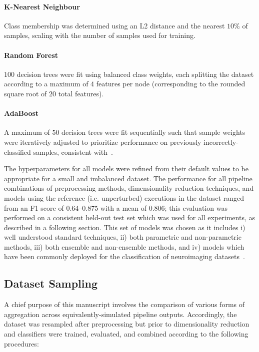 \documentclass[10pt]{SelfArx} %
\begin{document}
\paragraph{K-Nearest Neighbour} Class membership was determined using an L2 distance and the nearest $10\%$ of
samples, scaling with the number of samples used for training.

\paragraph{Random Forest} $100$ decision trees were fit using balanced class weights, each splitting the dataset
according to a maximum of $4$ features per node (corresponding to the rounded square root of $20$ total features).

\paragraph{AdaBoost} A maximum of $50$ decision trees were fit sequentially such that sample weights were iteratively
adjusted to prioritize performance on previously incorrectly-classified samples, consistent with~\cite{Freund1997-qy}.

The hyperparameters for all models were refined from their default values to be appropriate for a small and imbalanced
dataset. The performance for all pipeline combinations of preprocessing methods, dimensionality reduction techniques,
and models using the reference (i.e. unperturbed) executions in the dataset ranged from an F1 score of $0.64 – 0.875$
with a mean of $0.806$; this evaluation was performed on a consistent held-out test set which was used for all
experiments, as described in a following section. This set of models was chosen as it includes i) well understood
standard techniques, ii) both parametric and non-parametric methods, iii) both ensemble and non-ensemble
methods, and iv) models which have been commonly deployed for the classification of neuroimaging
datasets~\cite{Meier2012-ve,Tunc2016-cz,Zhu2018-cs,Payabvash2019-tm,Crossley2014-tg,Park2015-uj,Nayak2016-wl,Tolan2018-nq}.

\subsection*{Dataset Sampling}

A chief purpose of this manuscript involves the comparison of various forms of aggregation across
equivalently-simulated pipeline outputs. Accordingly, the dataset was resampled after preprocessing but prior to
dimensionality reduction and classifiers were trained, evaluated, and combined according to the following procedures:
\end{document}
